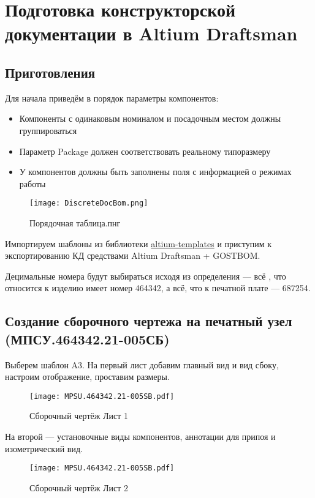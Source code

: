 \chapter[Подготовка КД]{Подготовка конструкторской документации в Altium Draftsman}

\section{Приготовления}

Для начала приведём в порядок параметры компонентов:
\begin{itemize}
	\item Компоненты с одинаковым номиналом и посадочным местом должны группироваться
	\item Параметр Package должен соответствовать реальному типоразмеру
	\item У компонентов должны быть заполнены поля с информацией о режимах работы
\end{itemize}
\begin{figure}[H]
	\centering
	\texttt{[image: DiscreteDocBom.png]}
	\caption{Порядочная таблица.пнг}%
	\label{fig:DiscreteDocBom}
\end{figure}

Импортируем шаблоны из библиотеки \href{https://github.com/dee3mon/altium-templates}{altium-templates} и приступим к экспортированию КД средствами Altium Draftsman + GOSTBOM.

Децимальные номера будут выбираться исходя из определения --- всё , что относится к изделию имеет номер 464342, а всё, что к печатной плате --- 687254.

\section[Создание сборочного чертежа на печатный узел]{Создание сборочного чертежа на печатный узел (МПСУ.464342.21-005СБ)}

Выберем шаблон A3. На первый лист добавим главный вид и вид сбоку, настроим отображение, проставим размеры.
\begin{figure}[H]
	\centering
	\texttt{[image: MPSU.464342.21-005SB.pdf]}
	\caption{Сборочный чертёж Лист 1}%
	\label{fig:PU_SB1}
\end{figure}


На второй --- установочные виды компонентов, аннотации для припоя и изометрический вид.
\begin{figure}[H]
	\centering
	\texttt{[image: MPSU.464342.21-005SB.pdf]}
	\caption{Сборочный чертёж Лист 2}%
	\label{fig:PU_SB2}
\end{figure}

